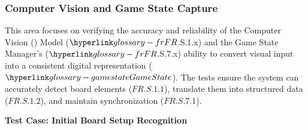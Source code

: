 \documentclass[12pt, titlepage]{article}
\begin{document}
\subsubsection{Computer Vision and Game State Capture}

This area focuses on verifying the accuracy and reliability of the Computer Vision (\CV{}) Model ($\FR{}$.S.1.x) and the Game State Manager's ($\FR{}$.S.7.x) ability to convert visual input into a consistent digital representation ($\GameState{}$). The tests ensure the system can accurately detect board elements ($\hyperref[FR.S.1.1]{FR.S.1.1}$), translate them into structured data ($\hyperref[FR.S.1.2]{FR.S.1.2}$), and maintain synchronization ($\hyperref[FR.S.7.1]{FR.S.7.1}$).

\textbf{Test Case: Initial Board Setup Recognition}
\end{document}
